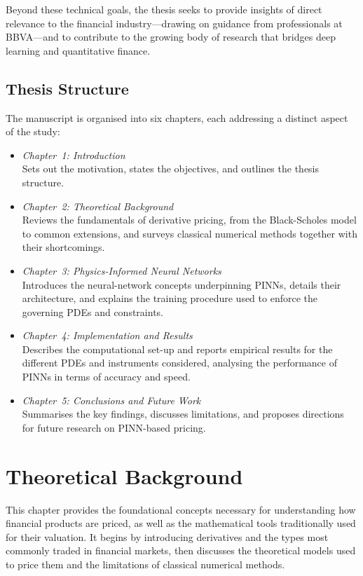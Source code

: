 \documentclass[12pt]{report} %
\theoremstyle{plain} %
\theoremstyle{definition} %
\theoremstyle{remark} %
\begin{document}
Beyond these technical goals, the thesis seeks to provide insights of direct relevance to the
financial industry—drawing on guidance from professionals at BBVA—and to contribute to the
growing body of research that bridges deep learning and quantitative finance.

\section{Thesis Structure}

The manuscript is organised into six chapters, each addressing a distinct aspect of the study:
\begin{itemize}
 \item \textit{Chapter~1: Introduction} \\[2pt]
 Sets out the motivation, states the objectives, and outlines the thesis structure.

 \item \textit{Chapter~2: Theoretical Background} \\[2pt]
 Reviews the fundamentals of derivative pricing, from the Black-Scholes model to common
 extensions, and surveys classical numerical methods together with their shortcomings.

 \item \textit{Chapter~3: Physics-Informed Neural Networks} \\[2pt]
 Introduces the neural-network concepts underpinning PINNs, details their architecture,
 and explains the training procedure used to enforce the governing PDEs and constraints.

 \item \textit{Chapter~4: Implementation and Results} \\[2pt]
 Describes the computational set-up and reports empirical results for the different PDEs
 and instruments considered, analysing the performance of PINNs in terms of accuracy and
 speed.

 \item \textit{Chapter~5: Conclusions and Future Work} \\[2pt]
 Summarises the key findings, discusses limitations, and proposes directions for future
 research on PINN-based pricing.
\end{itemize}

\chapter{Theoretical Background}
This chapter provides the foundational concepts necessary for understanding how financial products
are priced, as well as the mathematical tools traditionally used for their valuation. It begins by
introducing derivatives and the types most commonly traded in financial markets, then discusses the
theoretical models used to price them and the limitations of classical numerical methods.
\end{document}
